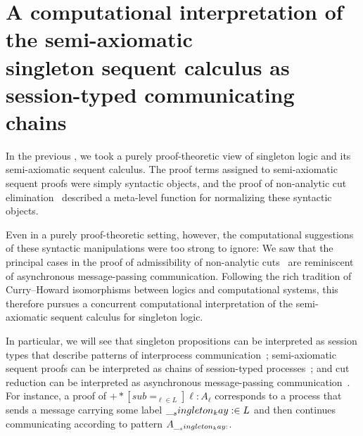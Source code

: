 \chapter{A computational interpretation of the semi-axiomatic\\singleton sequent calculus as session-typed communicating chains}\label{ch:process-chains}

In the previous , we took a purely proof-theoretic view of singleton logic and its semi-axiomatic sequent calculus.
The proof terms assigned to semi-axiomatic sequent proofs were simply syntactic objects,
and the proof of non-analytic cut elimination~ described a meta-level function for normalizing these syntactic objects.

Even in a purely proof-theoretic setting, however, the computational suggestions of these syntactic manipulations were too strong to ignore:
We saw that the principal cases in the proof of admissibility of non-analytic cuts~%
are reminiscent of asynchronous message-passing communication.
Following the rich tradition of Curry--Howard isomorphisms between logics and computational systems, this  therefore pursues a concurrent computational interpretation of the semi-axiomatic sequent calculus for singleton logic.

In particular, we will see that singleton propositions can be interpreted as session types that describe patterns of interprocess communication~; semi-axiomatic sequent proofs can be interpreted as chains of session-typed processes~; and cut reduction can be interpreted as asynchronous message-passing communication~.
For instance, a proof of $\plus*[sub=_{\ell \in L}]{\ell:A_{\ell}}$ corresponds to a process that sends a message carrying some label $\__singleton_kay: \in L$ and then continues communicating according to pattern $A_{\__singleton_kay:}$.

